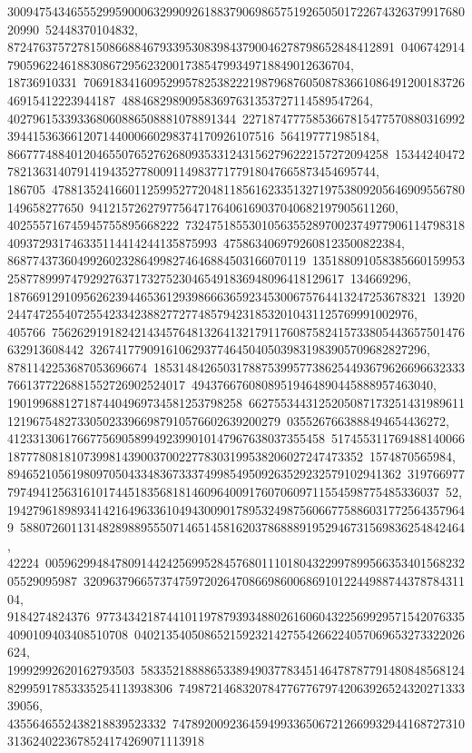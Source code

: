 {{{30094754346555299590006329909261883790698657519265050172267432637991768020990\
52448370104832, 8724763757278150866884679339530839843790046278798652848412891\
0406742914790596224618830867295623200173854799349718849012636704, 18736910331\
70691834160952995782538222198796876050878366108649120018372646915412223944187\
488468298909583697631353727114589547264, 402796153393368060886508881078891344\
22718747775853667815477570880316992394415363661207144000660298374170926107516\
564197771985184, 866777488401204655076527626809353312431562796222157272094258\
153442404727821363140791419435277800911498377177918047665873454695744, 186705\
47881352416601125995277204811856162335132719753809205646909556780149658277650\
941215726279775647176406169037040682197905611260, 402555716745945755895668222\
73247518553010563552897002374977906114798318409372931746335114414244135875993\
4758634069792608123500822384, 86877437360499260232864998274646884503166070119\
13518809105838566015995325877899974792927637173275230465491836948096418129617\
134669296, 187669129109562623944653612939866636592345300675764413247253678321\
139202447472554072554233423882772774857942318532010431125769991002976, 405766\
75626291918242143457648132641321791176087582415733805443657501476632913608442\
32674177909161062937746450405039831983905709682827296, 8781142253687053696674\
18531484265031788753995773862544936796266966323337661377226881552726902524017\
49437667608089519464890445888957463040, 1901996881271874404969734581253798258\
66275534431252050871732514319896111219675482733050233966987910576602639200279\
0355267663888494654436272, 41233130617667756905899492399010147967638037355458\
51745531176948814006618777808181073998143900370022778303199538206027247473352\
1574870565984, 89465210561980970504334836733374998549509263529232579102941362\
31976697779749412563161017445183568181460964009176070609711554598775485336037\
52, 1942796189893414216496336104943009017895324987560667758860317725643579649\
5880726011314828988955507146514581620378688891952946731569836254842464, 42224\
00596299484780914424256995284576801110180432299789956635340156823205529095987\
32096379665737475972026470866986006869101224498874437878431104, 9184274824376\
97734342187441011978793934880261606043225699295715420763354090109403408510708\
0402135405086521592321427554266224057069653273322026624, 19992992620162793503\
58335218888653389490377834514647878779148084856812482995917853335254113938306\
74987214683207847767767974206392652432027133339056, 4355646552438218839523332\
74789200923645949933650672126699329441687273103136240223678524174269071113918\
}}}
